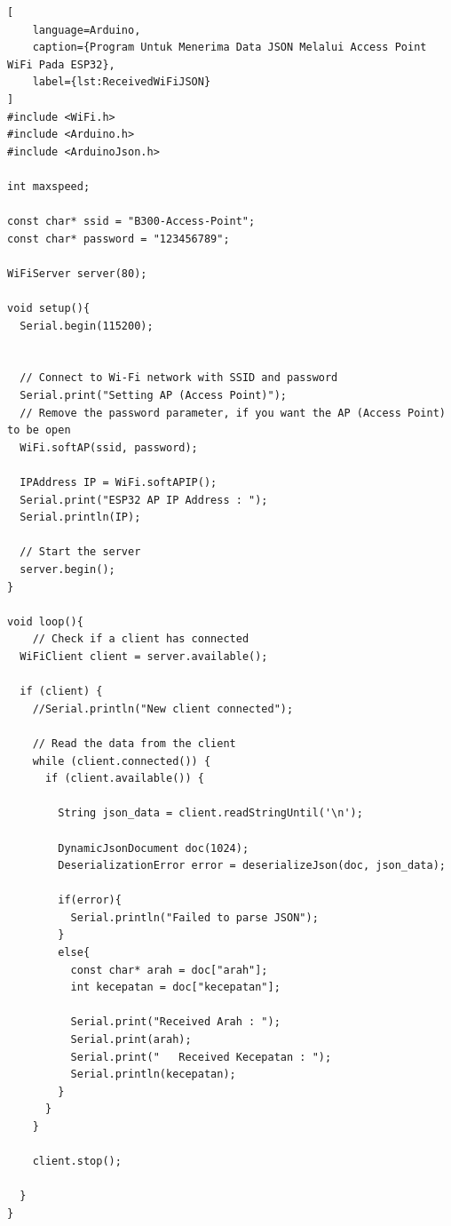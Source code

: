 \begin{lstlisting}[
    language=Arduino,
    caption={Program Untuk Menerima Data JSON Melalui Access Point WiFi Pada ESP32},
    label={lst:ReceivedWiFiJSON}
]
#include <WiFi.h>
#include <Arduino.h>
#include <ArduinoJson.h>

int maxspeed;

const char* ssid = "B300-Access-Point";
const char* password = "123456789";

WiFiServer server(80);

void setup(){
  Serial.begin(115200);


  // Connect to Wi-Fi network with SSID and password
  Serial.print("Setting AP (Access Point)");
  // Remove the password parameter, if you want the AP (Access Point) to be open
  WiFi.softAP(ssid, password);
 
  IPAddress IP = WiFi.softAPIP();
  Serial.print("ESP32 AP IP Address : ");
  Serial.println(IP);

  // Start the server
  server.begin();
}

void loop(){
    // Check if a client has connected
  WiFiClient client = server.available();

  if (client) {
    //Serial.println("New client connected");
    
    // Read the data from the client
    while (client.connected()) {
      if (client.available()) {
    
        String json_data = client.readStringUntil('\n');

        DynamicJsonDocument doc(1024);
        DeserializationError error = deserializeJson(doc, json_data);

        if(error){
          Serial.println("Failed to parse JSON");
        }
        else{
          const char* arah = doc["arah"];
          int kecepatan = doc["kecepatan"];

          Serial.print("Received Arah : ");
          Serial.print(arah);
          Serial.print("   Received Kecepatan : ");
          Serial.println(kecepatan);
        }
      }
    }

    client.stop();

  }
}
\end{lstlisting}

